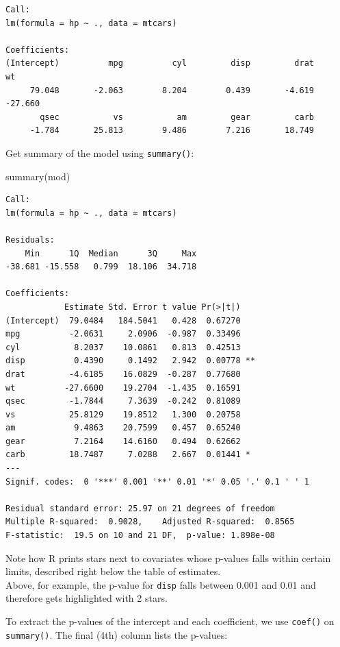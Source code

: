 \documentclass[
]{book}
\newenvironment{Shaded}{\begin{snugshade}}{\end{snugshade}}
\newcommand{\FunctionTok}[1]{\textcolor[rgb]{0.00,0.00,0.00}{#1}}
\newcommand{\NormalTok}[1]{#1}
\begin{document}
\begin{verbatim}
Call:
lm(formula = hp ~ ., data = mtcars)

Coefficients:
(Intercept)          mpg          cyl         disp         drat           wt  
     79.048       -2.063        8.204        0.439       -4.619      -27.660  
       qsec           vs           am         gear         carb  
     -1.784       25.813        9.486        7.216       18.749  
\end{verbatim}

Get summary of the model using \texttt{summary()}:

\begin{Shaded}
\begin{Highlighting}[]
\FunctionTok{summary}\NormalTok{(mod)}
\end{Highlighting}
\end{Shaded}

\begin{verbatim}
Call:
lm(formula = hp ~ ., data = mtcars)

Residuals:
    Min      1Q  Median      3Q     Max 
-38.681 -15.558   0.799  18.106  34.718 

Coefficients:
            Estimate Std. Error t value Pr(>|t|)   
(Intercept)  79.0484   184.5041   0.428  0.67270   
mpg          -2.0631     2.0906  -0.987  0.33496   
cyl           8.2037    10.0861   0.813  0.42513   
disp          0.4390     0.1492   2.942  0.00778 **
drat         -4.6185    16.0829  -0.287  0.77680   
wt          -27.6600    19.2704  -1.435  0.16591   
qsec         -1.7844     7.3639  -0.242  0.81089   
vs           25.8129    19.8512   1.300  0.20758   
am            9.4863    20.7599   0.457  0.65240   
gear          7.2164    14.6160   0.494  0.62662   
carb         18.7487     7.0288   2.667  0.01441 * 
---
Signif. codes:  0 '***' 0.001 '**' 0.01 '*' 0.05 '.' 0.1 ' ' 1

Residual standard error: 25.97 on 21 degrees of freedom
Multiple R-squared:  0.9028,    Adjusted R-squared:  0.8565 
F-statistic:  19.5 on 10 and 21 DF,  p-value: 1.898e-08
\end{verbatim}

Note how R prints stars next to covariates whose p-values falls within certain limits, described right below the table of estimates.\\
Above, for example, the p-value for \texttt{disp} falls between 0.001 and 0.01 and therefore gets highlighted with 2 stars.

To extract the p-values of the intercept and each coefficient, we use \texttt{coef()} on \texttt{summary()}. The final (4th) column lists the p-values:
\end{document}
